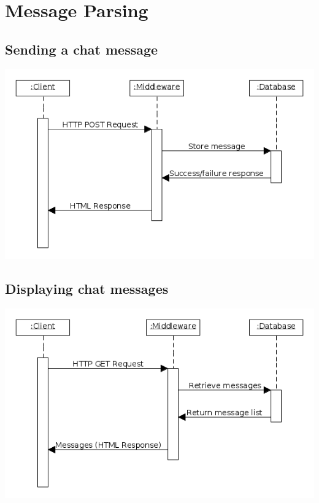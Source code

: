 \documentclass{sig-alt-release2}
\begin{document}
\section{Message Parsing}
\subsection{Sending a chat message}
\includegraphics[scale=0.4]{postmessage.png}


\subsection{Displaying chat messages}
\includegraphics[scale=0.4]{getmessage.png}
\end{document}
